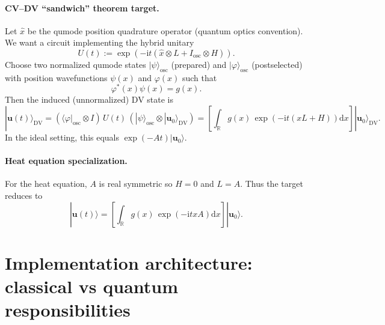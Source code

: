 \documentclass[11pt]{article}
\newcommand{\dd}{\mathrm{d}}
\newcommand{\ii}{\mathrm{i}}
\newcommand{\RR}{\mathbb{R}}
\begin{document}
\paragraph{CV--DV ``sandwich'' theorem target.}
Let $\hat{x}$ be the qumode position quadrature operator (quantum optics convention).
We want a circuit implementing the hybrid unitary
\begin{equation}
U(t):=\exp\!\left(-\ii t(\hat{x}\otimes L + I_{\mathrm{osc}}\otimes H)\right).
\end{equation}
Choose two normalized qumode states \(|\psi\rangle_{\mathrm{osc}}\) (prepared) and \(|\varphi\rangle_{\mathrm{osc}}\) (postselected)
with position wavefunctions \(\psi(x)\) and \(\varphi(x)\) such that
\begin{equation}
\varphi^*(x)\psi(x)=g(x).
\end{equation}
Then the induced (unnormalized) DV state is
\begin{equation}
|\mathbf u(t)\rangle_{\mathrm{DV}}
=
\left(\langle \varphi|_{\mathrm{osc}}\otimes I\right)\,U(t)\,\left(|\psi\rangle_{\mathrm{osc}}\otimes|\mathbf u_0\rangle_{\mathrm{DV}}\right)
=
\left[\int_{\RR} g(x)\,\exp\!\left(-\ii t(xL+H)\right)\dd x\right]|\mathbf u_0\rangle_{\mathrm{DV}}.
\end{equation}
In the ideal setting, this equals $\exp(-At)|\mathbf u_0\rangle$.

\paragraph{Heat equation specialization.}
For the heat equation, $A$ is real symmetric so $H=0$ and $L=A$.
Thus the target reduces to
\begin{equation}
|\mathbf u(t)\rangle
=
\left[\int_{\RR} g(x)\,\exp(-\ii t x A)\dd x\right]|\mathbf u_0\rangle.
\end{equation}

\section{Implementation architecture: classical vs quantum responsibilities}
\end{document}
